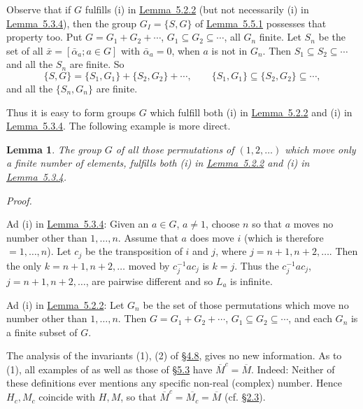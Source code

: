 \documentclass[b5paper,twoside]{article}
\newcommand{\secref}[2]{\hyperref[#1]{\mbox{\S#2}}}
\newcommand{\lemref}[2]{\hyperref[#1]{\mbox{Lemma~#2}}}
\theoremstyle{mvnplain}
\newtheorem{lemma}{Lemma}[section]
\renewenvironment{proof}[1][Proof]{%
  \par\addvspace{0.35\baselineskip}%
  \noindent\textit{#1.}\ \normalfont\ignorespaces
}{%
  \par\addvspace{0.35\baselineskip}%
}
\newcommand{\M}{\mathbf M}
\newcommand{\Hilbert}{\mathfrak H}
\def\M{M}%
\def\Hilbert{H}%
\def\mathfrak#1{#1}%
\begin{document}
Observe that if \(\mathfrak G\) fulfills (i) in \lemref{lem:5.2.2}{5.2.2}
(but not necessarily (i) in \lemref{lem:5.3.4}{5.3.4}), then the group
\(\mathfrak G_I=\{\mathfrak S,\mathfrak G\}\) of
\lemref{lem:5.5.1}{5.5.1} possesses that property too. Put
\(\mathfrak G=\mathfrak G_1+\mathfrak G_2+\cdots\),
\(\mathfrak G_1\subseteq\mathfrak G_2\subseteq\cdots\), all
\(\mathfrak G_n\) finite. Let \(\mathfrak S_n\) be the set of all
\(\bar x=[\bar\alpha_a;a\in\mathfrak G]\) with \(\bar\alpha_a=0\), when
\(a\) is not in \(\mathfrak G_n\). Then
\(\mathfrak S_1\subseteq\mathfrak S_2\subseteq\cdots\) and all the
\(\mathfrak S_n\) are finite. So
\[
 \{\mathfrak S,\mathfrak G\}
 =\{\mathfrak S_1,\mathfrak G_1\}
  +\{\mathfrak S_2,\mathfrak G_2\}+\cdots,
 \qquad
 \{\mathfrak S_1,\mathfrak G_1\}
 \subseteq\{\mathfrak S_2,\mathfrak G_2\}\subseteq\cdots,
\]
and all the \(\{\mathfrak S_n,\mathfrak G_n\}\) are finite.

Thus it is easy to form groups \(\mathfrak G\) which fulfill both (i) in
\lemref{lem:5.2.2}{5.2.2} and (i) in \lemref{lem:5.3.4}{5.3.4}. The following
example is more direct.

\begin{lemma}\label{lem:5.6.2}
The group \(\mathfrak G\) of all those permutations of
\((1,2,\ldots)\) which move only a finite number of elements, fulfills both
(i) in \lemref{lem:5.2.2}{5.2.2} and (i) in
\lemref{lem:5.3.4}{5.3.4}.
\end{lemma}

\begin{proof}
Ad (i) in \lemref{lem:5.3.4}{5.3.4}: Given an
\(a\in\mathfrak G\), \(a\ne1\), choose \(n\) so that \(a\) moves no number
other than \(1,\ldots,n\). Assume that \(a\) does move \(i\) (which is
therefore \(=1,\ldots,n\)). Let \(c_j\) be the transposition of \(i\) and
\(j\), where \(j=n+1,n+2,\ldots\). Then the only
\(k=n+1,n+2,\ldots\) moved by \(c_j^{-1}ac_j\) is \(k=j\). Thus the
\(c_j^{-1}ac_j\), \(j=n+1,n+2,\ldots\), are pairwise different and so
\(\mathfrak L_a\) is infinite.

Ad (i) in \lemref{lem:5.2.2}{5.2.2}: Let \(\mathfrak G_n\) be the set of
those permutations which move no number other than \(1,\ldots,n\). Then
\(\mathfrak G=\mathfrak G_1+\mathfrak G_2+\cdots\),
\(\mathfrak G_1\subseteq\mathfrak G_2\subseteq\cdots\), and each
\(\mathfrak G_n\) is a finite subset of \(\mathfrak G\).
\end{proof}

The analysis of the invariants (1), (2) of \secref{sec:4.8}{4.8}, gives no
new information. As to (1), all examples of \cite{ref5} as well as
those of \secref{sec:5.3}{5.3} have
\(\overline{\M}^{c}=\overline{\M}\). Indeed: Neither of these definitions
ever mentions any specific non-real (complex) number. Hence
\(\Hilbert_c,\M_c\) coincide with \(\Hilbert,\M\), so that
\(\overline{\M}^{c}=\overline{\M_c}=\overline{\M}\) (cf.
\secref{sec:2.3}{2.3}).
\end{document}
